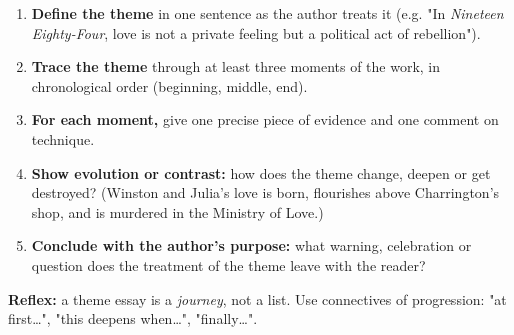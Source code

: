 \documentclass[11pt]{article}
\begin{document}
\begin{methode}
\begin{enumerate}
\item \textbf{Define the theme} in one sentence as the author treats it (e.g. "In \emph{Nineteen Eighty-Four}, love is not a private feeling but a political act of rebellion").
\item \textbf{Trace the theme} through at least three moments of the work, in chronological order (beginning, middle, end).
\item \textbf{For each moment,} give one precise piece of evidence and one comment on technique.
\item \textbf{Show evolution or contrast:} how does the theme change, deepen or get destroyed? (Winston and Julia's love is born, flourishes above Charrington's shop, and is murdered in the Ministry of Love.)
\item \textbf{Conclude with the author's purpose:} what warning, celebration or question does the treatment of the theme leave with the reader?
\end{enumerate}
\textbf{Reflex:} a theme essay is a \emph{journey}, not a list. Use connectives of progression: "at first…", "this deepens when…", "finally…".
\end{methode}
\end{document}
